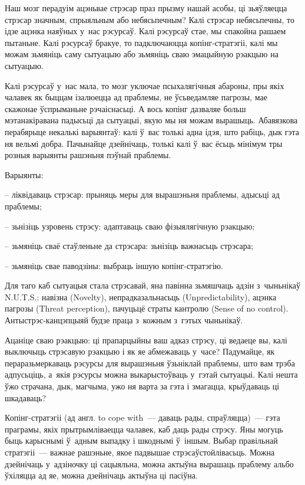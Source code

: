 Наш мозг перадуім ацэньвае стрэсар праз прызму нашай асобы, ці зьяўляецца стрэсар значным, спрыяльным або небясьпечным? Калі стрэсар небясьпечны, то ідзе ацэнка наяўных у~нас рэсурсаў. Калі рэсурсаў стае, мы спакойна рашаем пытаньне. Калі рэсурсаў бракуе, то падключаюцца копінг-стратэгіі, калі мы можам зьмяніць саму сытуацыю або зьмяніць сваю эмацыйную рэакцыю на сытуацыю.

Калі рэсурсаў у~нас мала, то мозг уключае псыхалягічныя абароны, пры якіх чалавек як быццам ізалюецца ад праблемы, не ўсьведамляе пагрозы, мае скажонае ўспрыманьне рэчаіснасьці. А вось копінг дазваляе больш мэтанакіравана падысьці да сытуацыі, якую мы ня можам вырашыць. Абавязкова перабярыце некалькі варыянтаў: калі ў~вас толькі адна ідэя, што рабіць, дык гэта ня вельмі добра. Пачынайце дзейнічаць, толькі калі ў~вас ёсьць мінімум тры розныя варыянты рашэньня пэўнай праблемы.

Варыянты: 

– ліквідаваць стрэсар: прыняць меры для вырашэньня праблемы, адысьці ад праблемы;

– зьнізіць узровень стрэсу: адаптаваць сваю фізыялягічную рэакцыю;

– зьмяніць сваё стаўленьне да стрэсара: зьнізіць важнасьць стрэсара;

– зьмяніць свае паводзіны: выбраць іншую копінг-стратэгію.

Для таго каб сытуацыя стала стрэсавай, яна павінна зьмяшчаць адзін з~чыньнікаў N.U.T.S.: навізна (Novelty), непрадказальнасьць (Unpredictability), ацэнка пагрозы (Threat perception), пачуцьцё страты кантролю (Sense of no control). Антыстрэс-канцэпцыяй будзе праца з~кожным з~гэтых чыньнікаў.

Ацаніце сваю рэакцыю: ці прапарцыйны ваш адказ стрэсу, ці ведаеце вы, калі выключыць стрэсавую рэакцыю і як яе абмежаваць у~часе? Падумайце, як пераразьмеркаваць рэсурсы для вырашэньня ўзьніклай праблемы, што вам трэба адпусьціць, а~якія рэсурсы можна выкарыстоўваць у~гэтай сытуацыі. Калі нешта ўжо страчана, дык, магчыма, ужо ня варта за гэта і змагацца, крыўдаваць ці шкадаваць?

Копінг-стратэгіі (ад англ. to cope with~--- даваць рады, спраўляцца)~--- гэта праграмы, якіх прытрымліваецца чалавек, каб даць рады стрэсу. Яны могуць быць карыснымі ў~адным выпадку і шкоднымі ў~іншым. Выбар правільнай стратэгіі~--- важнае рашэньне, якое падвышае стрэсаўстойлівасьць. Можна дзейнічаць у~адзіночку ці сацыяльна, можна актыўна вырашаць праблему альбо ўхіляцца ад яе, можна дзейнічаць актыўна ці пасіўна.

